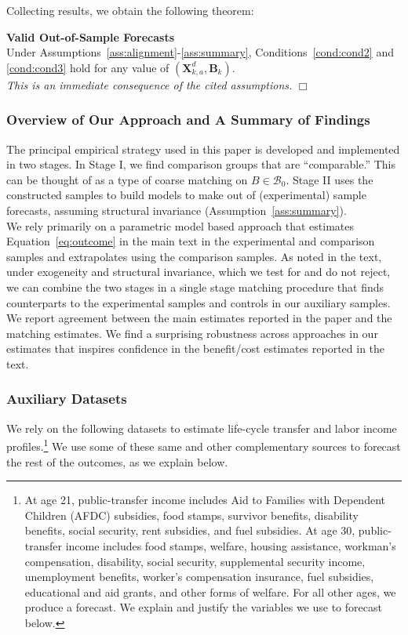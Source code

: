 \noindent Collecting results, we obtain the following theorem:

\onehalfspacing
\setcounter{theorem}{0}
\begin{theorem}\label{theorem:main} \textbf{Valid Out-of-Sample Forecasts} \\
Under Assumptions~\ref{ass:alignment}-\ref{ass:summary}, Conditions~\ref{cond:cond2} and \ref{cond:cond3} hold for any value of $\left( \bm{X}^d_{k,a}, \bm{B}_k \right)$. \\
\emph{This is an immediate consequence of the cited assumptions.} $\Box$
\end{theorem}
\doublespacing

\subsubsection{Overview of Our Approach and A Summary of Findings}

\noindent The principal empirical strategy used in this paper is developed and implemented in two stages. In Stage I, we find comparison groups that are ``comparable.'' This can be thought of as a type of coarse matching on $B \in \mathcal{B}_0$. Stage II uses the constructed samples to build models to make out of (experimental) sample forecasts, assuming structural invariance (Assumption~\ref{ass:summary}). \\

\noindent We rely primarily on a parametric model based approach that estimates Equation~\eqref{eq:outcome} in the main text in the experimental and comparison samples and extrapolates using the comparison samples. As noted in the text, under exogeneity and structural invariance, which we test for and do not reject, we can combine the two stages in a single stage matching procedure that finds counterparts to the experimental samples and controls in our auxiliary samples. We report agreement between the main estimates reported in the paper and the matching estimates. We find a surprising robustness across approaches in our estimates that inspires confidence in the benefit/cost estimates reported in the text.

\subsubsection{Auxiliary Datasets} \label{app:datasets}

\noindent We rely on the following datasets to estimate life-cycle transfer and labor income profiles.\footnote{At age 21, public-transfer income includes Aid to Families with Dependent Children (AFDC) subsidies, food stamps, survivor benefits, disability benefits, social security, rent subsidies, and fuel subsidies. At age 30, public-transfer income includes food stamps, welfare, housing assistance, workman's compensation, disability, social security, supplemental security income, unemployment benefits, worker's compensation insurance, fuel subsidies, educational and aid grants, and other forms of welfare. For all other ages, we produce a forecast. We explain and justify the variables we use to forecast below.} We use some of these same and other complementary sources to forecast the rest of the outcomes, as we explain below.

